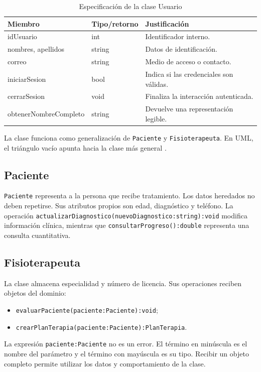 \begin{table}[H]
\centering
\caption{Especificación de la clase Usuario}
\begin{tabularx}{\textwidth}{L{4cm}L{3cm}X}
\toprule
\textbf{Miembro} & \textbf{Tipo/retorno} & \textbf{Justificación} \\
\midrule
idUsuario & int & Identificador interno. \\
nombres, apellidos & string & Datos de identificación. \\
correo & string & Medio de acceso o contacto. \\
iniciarSesion & bool & Indica si las credenciales son válidas. \\
cerrarSesion & void & Finaliza la interacción autenticada. \\
obtenerNombreCompleto & string & Devuelve una representación legible. \\
\bottomrule
\end{tabularx}
\end{table}

La clase funciona como generalización de \texttt{Paciente} y \texttt{Fisioterapeuta}. En UML, el triángulo vacío apunta hacia la clase más general \cite{OMG2017UML}.

\subsection{Paciente}
\texttt{Paciente} representa a la persona que recibe tratamiento. Los datos heredados no deben repetirse. Sus atributos propios son edad, diagnóstico y teléfono. La operación \texttt{actualizarDiagnostico(nuevoDiagnostico:string):void} modifica información clínica, mientras que \texttt{consultarProgreso():double} representa una consulta cuantitativa.

\subsection{Fisioterapeuta}
La clase almacena especialidad y número de licencia. Sus operaciones reciben objetos del dominio:
\begin{itemize}
  \item \texttt{evaluarPaciente(paciente:Paciente):void};
  \item \texttt{crearPlanTerapia(paciente:Paciente):PlanTerapia}.
\end{itemize}

La expresión \texttt{paciente:Paciente} no es un error. El término en minúscula es el nombre del parámetro y el término con mayúscula es su tipo. Recibir un objeto completo permite utilizar los datos y comportamiento de la clase.

